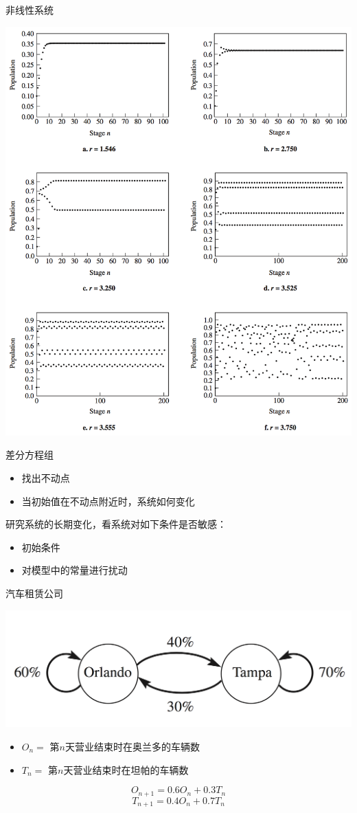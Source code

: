 \documentclass[UTF8, mathserif]{ctexbeamer}
\begin{document}
\begin{frame}{非线性系统}
  \begin{center}
    \includegraphics[width=.5\textwidth{}]{nonlinear.png}\\
  \end{center}
  
\end{frame}

\begin{frame}{差分方程组}
  \begin{itemize}
  \item 找出不动点
  \item 当初始值在不动点附近时，系统如何变化
  \end{itemize}

研究系统的长期变化，看系统对如下条件是否敏感：
\begin{itemize}
\item 初始条件
\item 对模型中的常量进行扰动
\end{itemize}

\end{frame}

\begin{frame}{汽车租赁公司}
  \begin{center}
    \includegraphics[width=.5\textwidth{}]{taxi.png}
  \end{center}
  \begin{definition}
    \begin{itemize}
    \item $O_n =$ 第$n$天营业结束时在奥兰多的车辆数
    \item $T_n =$ 第$n$天营业结束时在坦帕的车辆数
    \end{itemize}
  \end{definition}
  \[
  O_{n+1}=0.6O_n + 0.3T_n
  \]
  \[
  T_{n+1}=0.4O_n + 0.7T_n
  \]
\end{frame}
\end{document}

